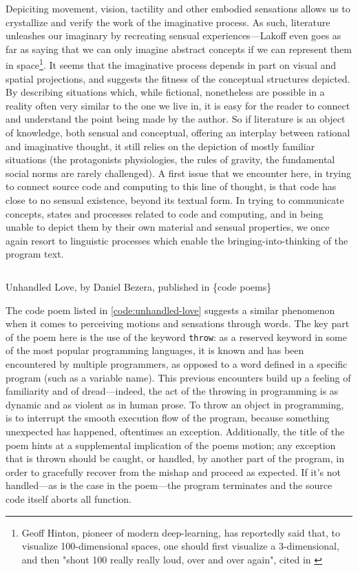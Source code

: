 Depiciting movement, vision, tactility and other embodied sensations allows us to crystallize and verify the work of the imaginative process. As such, literature unleashes our imaginary by recreating sensual experiences—Lakoff even goes as far as saying that we can only imagine abstract concepts if we can represent them in space\footnote{Geoff Hinton, pioneer of modern deep-learning, has reportedly said that, to visualize 100-dimensional spaces, one should first visualize a 3-dimensional, and then "shout 100 really really loud, over and over again", cited in \citep{akten_journey_2016}}. It seems that the imaginative process depends in part on visual and spatial projections, and suggests the fitness of the conceptual structures depicted. By describing situations which, while fictional, nonetheless are possible in a reality often very similar to the one we live in, it is easy for the reader to connect and understand the point being made by the author. So if literature is an object of knowledge, both sensual and conceptual, offering an interplay between rational and imaginative thought, it still relies on the depiction of mostly familiar situations (the protagonists physiologies, the rules of gravity, the fundamental social norms are rarely challenged). A first issue that we encounter here, in trying to connect source code and computing to this line of thought, is that code has close to no sensual existence, beyond its textual form. In trying to communicate concepts, states and processes related to code and computing, and in being unable to depict them by their own material and sensual properties, we once again resort to linguistic processes which enable the bringing-into-thinking of the program text.

\begin{listing}
    \inputminted[]{java}{./corpus/unhandled_love.java}
    \caption{Unhandled Love, by Daniel Bezera, published in \{code poems\} \citep{bertram_code_2012}}
    \label{code:unhandled-love}
\end{listing}

The code poem listed in \ref{code:unhandled-love} suggests a similar phenomenon when it comes to perceiving motions and sensations through words. The key part of the poem here is the use of the keyword \lstinline{throw}: as a reserved keyword in some of the most popular programming languages, it is known and has been encountered by multiple programmers, as opposed to a word defined in a specific program (such as a variable name). This previous encounters build up a feeling of familiarity and of dread—indeed, the act of the throwing in programming is as dynamic and as violent as in human prose. To throw an object in programming, is to interrupt the smooth execution flow of the program, because something unexpected has happened, oftentimes an exception. Additionally, the title of the poem hints at a supplemental implication of the poems motion; any exception that is thrown should be caught, or handled, by another part of the program, in order to gracefully recover from the mishap and proceed as expected. If it's not handled—as is the case in the poem—the program terminates and the source code itself aborts all function.

